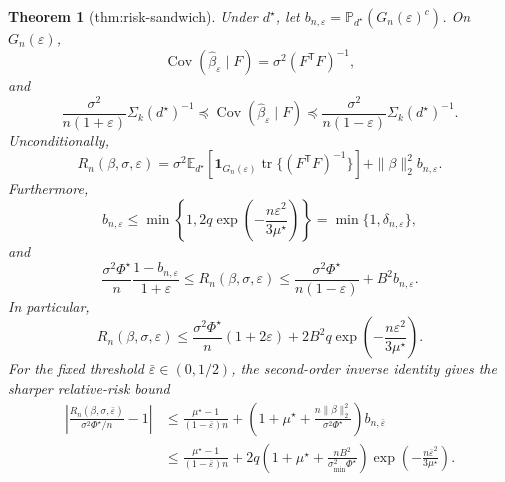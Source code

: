 \documentclass{article}
\newtheorem{theorem}{Theorem}
\begin{document}
\begin{theorem}[thm:risk-sandwich]\label{thm:risk-sandwich}
Under \(d^\star\), let \(b_{n,\varepsilon}=\mathbb P_{d^\star}(G_n(\varepsilon)^c)\). On \(G_n(\varepsilon)\),
\[
 \operatorname{Cov}(\widehat\beta_{\varepsilon}\mid F)
 =\sigma^2(F^{\mathsf T}F)^{-1},
\]
and
\[
 \frac{\sigma^2}{n(1+\varepsilon)}\Sigma_k(d^\star)^{-1}
 \preceq\operatorname{Cov}(\widehat\beta_{\varepsilon}\mid F)
 \preceq
 \frac{\sigma^2}{n(1-\varepsilon)}\Sigma_k(d^\star)^{-1}.
\]
Unconditionally,
\[
 R_n(\beta,\sigma,\varepsilon)
 =\sigma^2\mathbb E_{d^\star}\!\left[
 \mathbf 1_{G_n(\varepsilon)}
 \operatorname{tr}\{(F^{\mathsf T}F)^{-1}\}\right]
 +\|\beta\|_2^2b_{n,\varepsilon}.
\]
Furthermore,
\[
 b_{n,\varepsilon}\le
 \min\!\left\{1,2q\exp\!\left(-\frac{n\varepsilon^2}{3\mu^\star}\right)\right\}
 =\min\{1,\delta_{n,\varepsilon}\},
\]
and
\[
 \frac{\sigma^2\Phi^\star}{n}\frac{1-b_{n,\varepsilon}}{1+\varepsilon}
 \le R_n(\beta,\sigma,\varepsilon)
 \le \frac{\sigma^2\Phi^\star}{n(1-\varepsilon)}+B^2b_{n,\varepsilon}.
\]
In particular,
\[
 R_n(\beta,\sigma,\varepsilon)
 \le \frac{\sigma^2\Phi^\star}{n}(1+2\varepsilon)
 +2B^2q\exp\!\left(-\frac{n\varepsilon^2}{3\mu^\star}\right).
\]
For the fixed threshold \(\bar\varepsilon\in(0,1/2)\), the second-order inverse identity gives the sharper relative-risk bound
\[
\begin{aligned}
 \left|
 \frac{R_n(\beta,\sigma,\bar\varepsilon)}{\sigma^2\Phi^\star/n}-1
 \right|
 &\le
 \frac{\mu^\star-1}{(1-\bar\varepsilon)n}
 +\left(1+\mu^\star+
 \frac{n\|\beta\|_2^2}{\sigma^2\Phi^\star}\right)b_{n,\bar\varepsilon}\\
 &\le
 \frac{\mu^\star-1}{(1-\bar\varepsilon)n}
 +2q\left(1+\mu^\star+
 \frac{nB^2}{\sigma_{\min}^2\Phi^\star}\right)
 \exp\!\left(-\frac{n\bar\varepsilon^2}{3\mu^\star}\right).
\end{aligned}
\]
\end{theorem}
\end{document}

